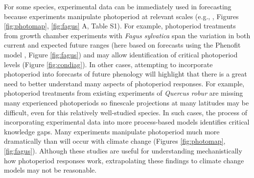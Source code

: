 \documentclass{article}
\begin{document}
\par For some species, experimental data can be immediately used in forecasting because experiments manipulate photoperiod at relevant scales (e.g., \citet{Basler:2014aa,Heide:2015aa}, Figures \ref{fig:photomap}, \ref{fig:fagus} A, Table S1).  For example, photoperiod treatments from growth chamber experiments with \emph{Fagus sylvatica} span the variation in both current and expected future ranges (here based on forecasts using the Phenofit model \citep{duputie2015}, Figure \ref{fig:fagus}) and may allow identification of critical photoperiod levels (Figure \ref{fig:condiag}). In other cases, attempting to incorporate photoperiod into forecasts of future phenology will highlight that there is a great need to better understand many aspects of photoperiod responses. For example, photoperiod treatments from  existing experiments of \emph{Quercus robur} are missing many experienced photoperiods so finescale projections at many latitudes may be difficult, even for this relatively well-studied species. In such cases, the process of incorporating experimental data into more process-based models identifies critical knowledge gaps. Many experiments manipulate photoperiod much more dramatically than will occur with climate change (Figures \ref{fig:photomap}, \ref{fig:fagus}). Although these studies are useful for understanding mechanistically how photoperiod responses work, extrapolating these findings to climate change models may not be reasonable.
\end{document}
